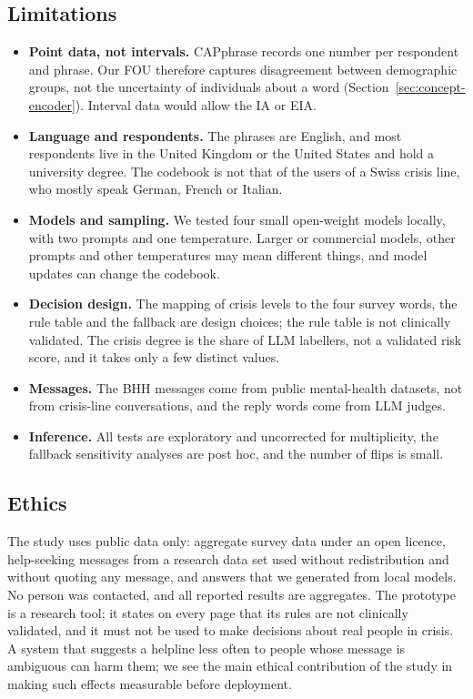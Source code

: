 \subsection{Limitations}
\label{sec:disc-limitations}

\begin{itemize}
\item \textbf{Point data, not intervals.} CAPphrase records one number per respondent and phrase. Our FOU therefore
captures disagreement between demographic groups, not the uncertainty of individuals about a word
(Section~\ref{sec:concept-encoder}). Interval data would allow the IA or EIA.
\item \textbf{Language and respondents.} The phrases are English, and most respondents live in the United Kingdom or the
United States and hold a university degree. The codebook is not that of the users of a Swiss crisis line, who mostly
speak German, French or Italian.
\item \textbf{Models and sampling.} We tested four small open-weight models locally, with two prompts and one
temperature. Larger or commercial models, other prompts and other temperatures may mean different things, and model
updates can change the codebook.
\item \textbf{Decision design.} The mapping of crisis levels to the four survey words, the rule table and the fallback
are design choices; the rule table is not clinically validated. The crisis degree is the share of LLM labellers, not a
validated risk score, and it takes only a few distinct values.
\item \textbf{Messages.} The BHH messages come from public mental-health datasets, not from crisis-line conversations,
and the reply words come from LLM judges.
\item \textbf{Inference.} All tests are exploratory and uncorrected for multiplicity, the fallback sensitivity analyses
are post hoc, and the number of flips is small.
\end{itemize}

\subsection{Ethics}
\label{sec:disc-ethics}

The study uses public data only: aggregate survey data under an open licence, help-seeking messages from a research
data set used without redistribution and without quoting any message, and answers that we generated from local models.
No person was contacted, and all reported results are aggregates.
The prototype is a research tool; it states on every page that its rules are not clinically validated, and it must not
be used to make decisions about real people in crisis.
A system that suggests a helpline less often to people whose message is ambiguous can harm them; we see the main
ethical contribution of the study in making such effects measurable before deployment.
